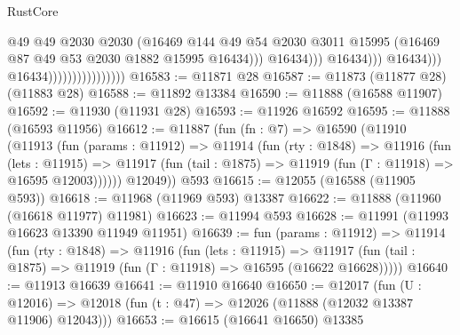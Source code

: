 \begin{lexlean}{RustCore}
\begin{coremodule}
                                                        @49
                                                        @49
                                                        @2030
                                                        @2030
                                                        (@16469
                                                          @144
                                                          @49
                                                          @54
                                                          @2030
                                                          @3011
                                                          @15995
                                                          (@16469
                                                            @87
                                                            @49
                                                            @53
                                                            @2030
                                                            @1882
                                                            @15995
                                                            @16434)))
                                                      @16434)))
                                                @16434)))
                                          @16434)))
                                    @16434))))))))))))))))
@16583 := @11871 @28
@16587 := @11873 (@11877 @28) (@11883 @28)
@16588 := @11892 @13384
@16590 := @11888 (@16588 @11907)
@16592 := @11930 (@11931 @28)
@16593 := @11926 @16592
@16595 := @11888 (@16593 @11956)
@16612 := @11887
    (fun (fn : @7) =>
    @16590
      (@11910
        (@11913
          (fun (params : @11912) =>
          @11914
            (fun (rty : @1848) =>
            @11916
              (fun (lets : @11915) =>
              @11917 (fun (tail : @1875) => @11919 (fun (Γ : @11918) => @16595 @12003))))))
        @12049))
    @593
@16615 := @12055 (@16588 (@11905 @593))
@16618 := @11968 (@11969 @593) @13387
@16622 := @11888 (@11960 (@16618 @11977) @11981)
@16623 := @11994 @593
@16628 := @11991 (@11993 @16623 @13390 @11949 @11951)
@16639 := fun (params : @11912) =>
  @11914
    (fun (rty : @1848) =>
    @11916
      (fun (lets : @11915) =>
      @11917 (fun (tail : @1875) => @11919 (fun (Γ : @11918) => @16595 (@16622 @16628)))))
@16640 := @11913 @16639
@16641 := @11910 @16640
@16650 := @12017
    (fun (U : @12016) => @12018 (fun (t : @47) => @12026 (@11888 (@12032 @13387 @11906) @12043)))
@16653 := @16615 (@16641 @16650) @13385

\end{coremodule}
\end{lexlean}

